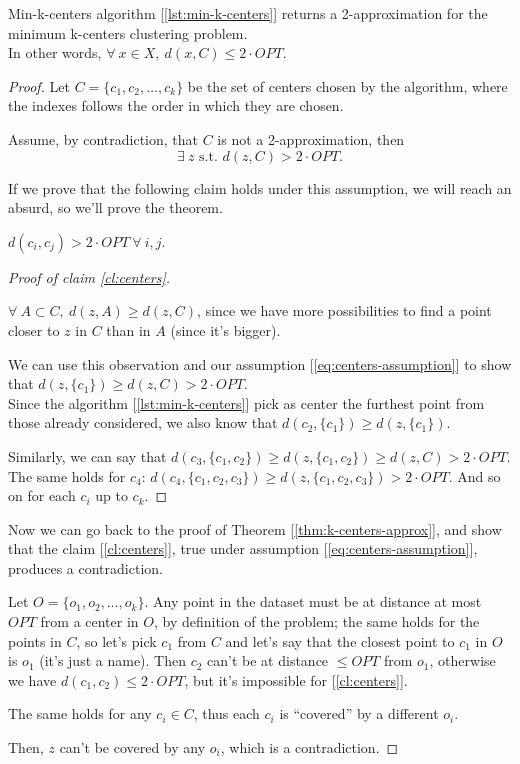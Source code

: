 \begin{thm}\label{thm:k-centers-approx}
    Min-k-centers algorithm [\ref{lst:min-k-centers}] returns a 2-approximation for the minimum k-centers clustering problem.\\
    In other words, $\forall\ x \in X,\ d(x,C) \leq 2 \cdot OPT$.
\end{thm}
\begin{proof}
    Let $C = \{c_1, c_2, \ldots, c_k\}$ be the set of centers chosen by the algorithm, where the indexes follows the order in which they are chosen.
    
    Assume, by contradiction, that $C$ is not a 2-approximation, then 
    \begin{equation}\label{eq:centers-assumption}
        \exists\ z \text{ s.t. } d(z, C) > 2 \cdot OPT.
    \end{equation}
    
    If we prove that the following claim holds under this assumption, we will reach an absurd, so we'll prove the theorem.
    \begin{claim}\label{cl:centers}
        $d(c_i, c_j) > 2 \cdot OPT\ \forall\ i,j$.
    \end{claim}
    \begin{proof}[Proof of claim \ref{cl:centers}]
        \begin{obs}
            $\forall\ A \subset C,\ d(z,A) \geq d(z,C)$, since we have more possibilities to find a point closer to $z$ in $C$ than in $A$ (since it's bigger).
        \end{obs}
        We can use this observation and our assumption [\ref{eq:centers-assumption}] to show that $d(z, \{c_1\}) \geq d(z,C) > 2 \cdot OPT$.\\
        Since the algorithm [\ref{lst:min-k-centers}] pick as center the furthest point from those already considered, we also know that $d(c_2, \{c_1\}) \geq d(z, \{c_1\})$.
        
        Similarly, we can say that $d(c_3, \{c_1, c_2\}) \geq d(z, \{c_1, c_2\}) \geq d(z,C) > 2 \cdot OPT$.
        The same holds for $c_4$: $d(c_4, \{c_1, c_2, c_3\}) \geq d(z, \{c_1, c_2, c_3\}) > 2 \cdot OPT$.
        And so on for each $c_i$ up to $c_k$.
    \end{proof}

    Now we can go back to the proof of Theorem [\ref{thm:k-centers-approx}], and show that the claim [\ref{cl:centers}], true under assumption [\ref{eq:centers-assumption}], produces a contradiction.
    
    Let $O = \{o_1, o_2, \ldots, o_k\}$. Any point in the dataset must be at distance at most $OPT$ from a center in $O$, by definition of the problem; the same holds for the points in $C$, so let's pick $c_1$ from $C$ and let's say that the closest point to $c_1$ in $O$ is $o_1$ (it's just a name). Then $c_2$ can't be at distance $\leq OPT$ from $o_1$, otherwise we have $d(c_1, c_2) \leq 2 \cdot OPT$, but it's impossible for [\ref{cl:centers}].
    
    The same holds for any $c_i \in C$, thus each $c_i$ is ``covered'' by a different $o_i$.
    
    Then, $z$ can't be covered by any $o_i$, which is a contradiction.
\end{proof}
